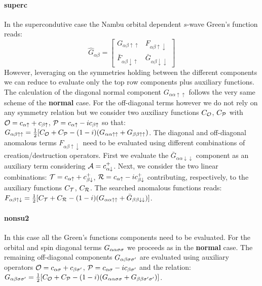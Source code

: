\documentclass[preprint,3p,10pt]{elsarticle}
\def\a{\alpha}       \def\b{\beta}   \def\g{\gamma}   \def\d{\delta}
\def\PP{{\cal P}}\def\EE{{\cal E}}\def\MM{{\cal M}} \def\VV{{\cal V}}
\def\TT{{\cal T}}\def\NN{{\cal N}}\def\BB{{\cal B}} \def\II{{\cal I}}
\def\RR{{\cal R}}\def\LL{{\cal L}}\def\JJ{{\cal J}} \def\OO{{\cal O}}
\def\AA{{\cal A}}
\def\up{\uparrow} \def\down{\downarrow} \def\dw{\downarrow}
\begin{document}
\paragraph{{\bf superc}}
In the supercondutive case the Nambu orbital
dependent $s$-wave Green's function reads:
\begin{equation}
  \label{GFnambu}
  \hat{G}_{\a\b} =
  \begin{bmatrix}
    G_{\a\b\up\up} & F_{\a\b\up\dw} \\
    \bar{F}_{\a\b\dw\up} & \bar{G}_{\a\b\dw\dw}
  \end{bmatrix}  
\end{equation}
However, leveraging on the symmetries holding between the different
components we can reduce to evaluate only the top row components plus
auxiliary functions.
The calculation of the diagonal normal component $G_{\a\a\up\up}$ follows the
very same scheme of the {\bf normal} case. For the off-diagonal terms
however we do not rely on any symmetry relation but we consider 
two auxiliary functions $C_\OO$, $C_\PP$ with $\OO=c_{\a\up} +
c_{\b\up}$, $\PP=c_{\a\up} -ic_{\b\up}$ so that:
$G_{\a\b\up\up}=\tfrac{1}{2}[C_\OO + C_\PP -
(1-i)(G_{\a\a\up\up}+G_{\b\b\up\up})$.
The diagonal and off-diagonal anomalous terms $F_{\a\b\up\dw}$ need to
be evaluated using different combinations of creation/destruction
operators. First we evaluate the $\bar{G}_{\a\a\dw\dw}$ component as
an auxiliary term considering $\AA=c^+_{\a\dw}$. 
Next, we consider the two linear combinations:
$\TT = c_{\a\up} + c^+_{\b\dw}$, $\RR=c_{\a\up} -i c^+_{\b\dw}$
contributing, respectively, to the auxiliary functions $C_\TT$,
$C_\RR$. The searched anomalous functions reads:
$F_{\a\b\up\dw} = \tfrac{1}{2}[ C_\TT + C_\RR - (1-i)(G_{\a\a\up\up} +
\bar{G}_{\b\b\dw\dw})]$. 


\paragraph{{\bf nonsu2}}
In this case all the Green's functions components need
to be evaluated. For the orbital and spin diagonal terms
$G_{\a\a\s\s}$  we proceeds as in the {\bf normal} case.
The remaining  off-diagonal components $G_{\a\b\s\s'}$ are
evaluated using auxiliary operators $\OO=c_{\a\s}+c_{\b\s'}$,
$\PP=c_{\a\s}-ic_{\b\s'}$ and the relation:
$G_{\a\b\s\s'}=\tfrac{1}{2}[C_\OO+C_\PP -
(1-i)(G_{\a\a\s\s}+G_{\b\b\s'\s'})]$.
\end{document}
